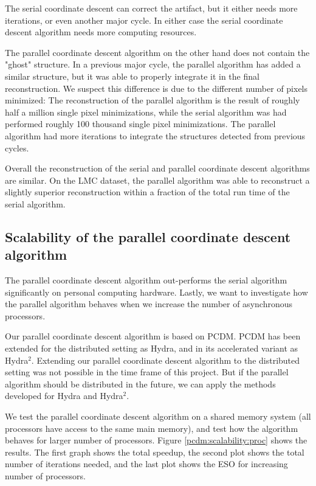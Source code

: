 The serial coordinate descent can correct the artifact, but it either needs more iterations, or even another major cycle. In either case the serial coordinate descent algorithm needs more computing resources.

The parallel coordinate descent algorithm on the other hand does not contain the "ghost" structure. In a previous major cycle, the parallel algorithm has added a similar structure, but it was able to properly integrate it in the final reconstruction. We suspect this difference is due to the different number of pixels minimized: The reconstruction of the parallel algorithm is the result of roughly half a million single pixel minimizations, while the serial algorithm was had performed roughly 100 thousand single pixel minimizations. The parallel algorithm had more iterations to integrate the structures detected from previous cycles.

Overall the reconstruction of the serial and parallel coordinate descent algorithms are similar. On the LMC dataset, the parallel algorithm was able to reconstruct a slightly superior reconstruction within a fraction of the total run time of the serial algorithm.


\subsection{Scalability of the parallel coordinate descent algorithm}\label{pcdm:scale}
The parallel coordinate descent algorithm out-performs the serial algorithm significantly on personal computing hardware. Lastly, we want to investigate how the parallel algorithm behaves when we increase the number of asynchronous processors.

Our parallel coordinate descent algorithm is based on PCDM\cite{richtarik2016parallel}. PCDM has been extended for the distributed setting as Hydra\cite{richtarik2016distributed}, and in its accelerated variant as Hydra$^2$\cite{fercoq2014fast}. Extending our parallel coordinate descent algorithm to the distributed setting was not possible in the time frame of this project. But if the parallel algorithm should be distributed in the future, we can apply the methods developed for Hydra and Hydra$^2$.

We test the parallel coordinate descent algorithm on a shared memory system (all processors have access to the same main memory), and test how the algorithm behaves for larger number of processors. Figure \ref{pcdm:scalability:proc} shows the results. The first graph shows the total speedup, the second plot shows the total number of iterations needed, and the last plot shows the ESO for increasing number of processors.

